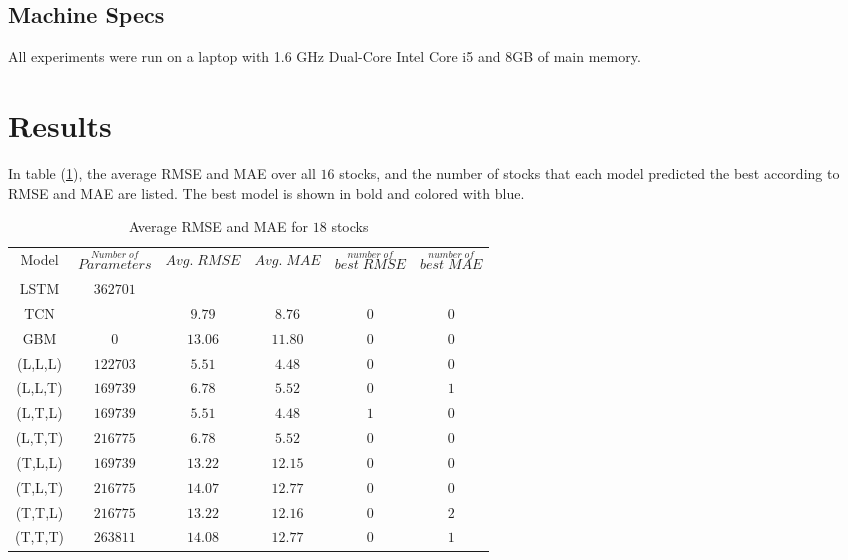 \documentclass[12pt, A4]{article}
\begin{document}
\subsection{Machine Specs}
All experiments were run on a laptop with 1.6 GHz Dual-Core Intel Core i5 and $8$GB of main memory.

\section{Results}

In table (\ref{Average RMSE_MAE_results}), the average RMSE and MAE over all $16$ stocks, and the number of stocks that each model predicted the best according to RMSE and MAE are listed. The best model is shown in bold and colored with blue.
\begin{table}[H]
	\footnotesize
	\begin{center}
		\begin{tabular}{| c | c | c | c | c | c |}
			\hline 
			Model & $\stackrel{Number\; of}{Parameters}$ & $Avg.\; RMSE$ & $Avg.\; MAE$ & $\stackrel{number\; of}{best\; RMSE}$ & $\stackrel{number \; of}{best\; MAE}$ \\ \cline{1-6}
			LSTM & $362701$& \cellcolor{blue!25}  \boldmath{$4.02$} & \cellcolor{blue!25}  \boldmath{$3.31$}  &\cellcolor{blue!25}  \boldmath{$15$} & \cellcolor{blue!25}  \boldmath{$13$} \\ \cline{1-6}
			TCN & \cellcolor{blue!25}  \boldmath{$87937$}&$9.79$ &$8.76$ & $0$ & $0$  \\ \cline{1-6}
			GBM & $0$ &$13.06$ & $11.80$ & $0$ & $0$ \\ \cline{1-6}
			(L,L,L)& $122703$ & $5.51$ & $4.48$ & $0$ & $0$  \\ \cline{1-6}
			(L,L,T) & $169739$ & $6.78$ & $5.52$  & $0$ & $1$ \\ \cline{1-6}
			(L,T,L) &  $169739$ & $5.51$ & $4.48$  & $1$ & $0$ \\ \cline{1-6}
			(L,T,T) & $216775$ & $6.78$ & $5.52$  & $0$ & $0$ \\ \cline{1-6}
			(T,L,L) & $169739$ & $13.22$ & $12.15$  & $0$ & $0$ \\ \cline{1-6}
			(T,L,T) & $216775$ & $14.07$ & $12.77$  & $0$ & $0$ \\ \cline{1-6}
			(T,T,L) & $216775$ & $13.22$ & $12.16$  & $0$ & $2$ \\ \cline{1-6}
			(T,T,T) & $263811$ & $14.08$ & $12.77$  & $0$ & $1$ \\ \cline{1-6}			
		\end{tabular}
		\caption{Average RMSE and MAE for $18$ stocks} \label{Average RMSE_MAE_results}
	\end{center}
\end{table}
\end{document}
